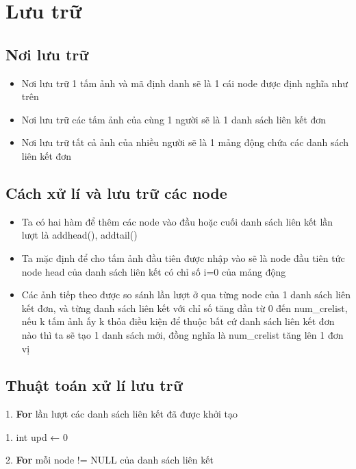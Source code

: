 \documentclass [14pt, a4paper]{report}
\begin{document}
\section{Lưu trữ}
\subsection{Nơi lưu trữ}
\begin{itemize}
\fontsize{13}{18}\selectfont

  \item Nơi lưu trữ 1 tấm ảnh và mã định danh sẽ là 1 cái node được định nghĩa như trên
  \item Nơi lưu trữ các tấm ảnh của cùng 1 người sẽ là 1 danh sách liên kết đơn
    \item  Nơi lưu trữ tất cả ảnh của nhiều người sẽ là 1 mảng động chứa các danh sách liên kết đơn
    
   
\end{itemize}
\subsection{Cách xử lí và lưu trữ các node }
\begin{itemize}
\fontsize{13}{18}\selectfont

  \item Ta có hai hàm để thêm các node vào đầu hoặc cuối danh sách liên kết lần lượt là addhead(), addtail()
  \item Ta mặc định để cho tấm ảnh đầu tiên được nhập vào sẽ là node đầu tiên tức node head của danh sách liên kết có chỉ số i=0 của mảng động
    \item  Các ảnh tiếp theo được so sánh lần lượt ở qua từng node của 1 danh sách liên kết đơn, và từng danh sách liên kết với chỉ số tăng dần từ 0 đến num\_crelist, nếu k tấm ảnh ấy k thỏa điều kiện để thuộc bất cứ danh sách liên kết đơn nào thì ta sẽ tạo 1 danh sách mới, đồng nghĩa là num\_crelist tăng lên 1 đơn vị
    \end{itemize}
\subsection{Thuật toán xử lí lưu trữ}

    1.  \textbf{For} lần lượt các danh sách liên kết đã được khởi tạo
    
    
 \hspace{1cm}  1.   int upd ← 0
 
 
\hspace{1cm}        	2.  \textbf{For} mỗi node != NULL của danh sách liên kết
\end{document}
